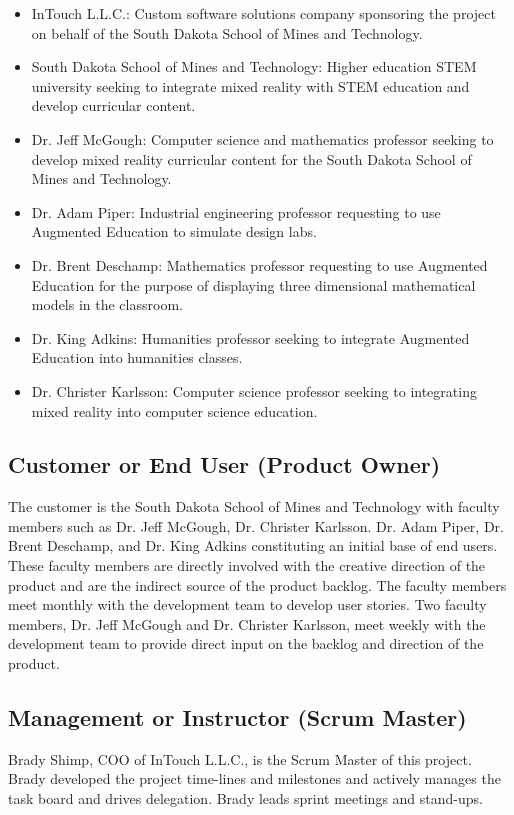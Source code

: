\begin{itemize}
	\item InTouch L.L.C.: Custom software solutions company sponsoring the project on behalf of the South Dakota School of Mines and Technology. 
	\item South Dakota School of Mines and Technology: Higher education STEM university seeking to integrate mixed reality with STEM education and develop curricular content.
	\item Dr. Jeff McGough: Computer science and mathematics professor seeking to develop mixed reality curricular content for the South Dakota School of Mines and Technology. 
	\item Dr. Adam Piper: Industrial engineering professor requesting to use Augmented Education to simulate design labs.
	\item Dr. Brent Deschamp: Mathematics professor requesting to use Augmented Education for the purpose of displaying three dimensional mathematical models in the classroom. 
	\item Dr. King Adkins: Humanities professor seeking to integrate Augmented Education into humanities classes. 
	\item Dr. Christer Karlsson: Computer science professor seeking to integrating mixed reality into computer science education.
\end{itemize}


\subsection{Customer or End User (Product Owner)} 
The customer is the South Dakota School of Mines and Technology with faculty members such as Dr. Jeff McGough, Dr. Christer Karlsson. Dr. Adam Piper, Dr. Brent Deschamp, and Dr. King Adkins constituting an initial base of end users. These faculty members are directly involved with the creative direction of the product and are the indirect source of the product backlog. The faculty members meet monthly with the development team to develop user stories. Two faculty members, Dr. Jeff McGough and Dr. Christer Karlsson, meet weekly with the development team to provide direct input on the backlog and direction of the product. 

\subsection{Management or Instructor (Scrum Master)} 

Brady Shimp, COO of InTouch L.L.C., is the Scrum Master of this project. Brady developed the project time-lines and milestones and actively manages the task board and drives delegation. Brady leads sprint meetings and stand-ups. 

